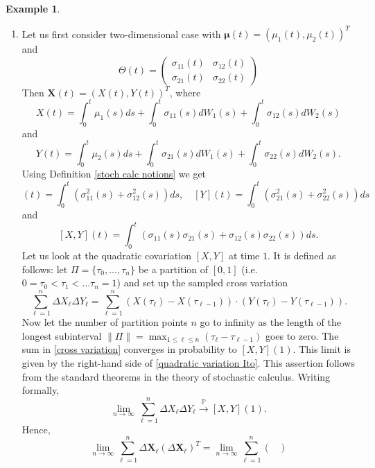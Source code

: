 \documentclass[a4paper,11pt]{article}
\theoremstyle{plain}
\theoremstyle{definition}
\newtheorem{exmp}[thm]{Example}
\begin{document}
	\begin{exmp} \label{quad var} \
		\begin{enumerate}
			\item 
			Let us first consider two-dimensional case with $\boldsymbol{\mu}(t) = (\mu_1(t), \mu_2(t))^T$ and
			\[\Theta(t) = \begin{pmatrix}
			\sigma_{11}(t) & \sigma_{12}(t) \\
			\sigma_{21}(t) & \sigma_{22}(t)
			\end{pmatrix} \]
			Then $\mathbf{X}(t) = (X(t), Y(t))^T$, where 
			\[X(t) = \int_0^t\mu_1(s) ds + \int_0^t\sigma_{11}(s) dW_1(s) + \int_0^t\sigma_{12}(s) dW_2(s)\] 
			and
			\[Y(t) = \int_0^t\mu_2(s) ds + \int_0^t\sigma_{21}(s) dW_1(s) + \int_0^t\sigma_{22}(s) dW_2(s).\]
			Using Definition \ref{stoch calc notions} we get
			\begin{equation}
			[X](t) = \int_{0}^{t}(\sigma_{11}^2(s) +\sigma_{12}^2(s)) ds, \quad  [Y](t) = \int_{0}^{t}(\sigma_{21}^2(s) +\sigma_{22}^2(s)) ds
			\end{equation}
			and
			\begin{equation} \label{quadratic variation Ito}
			[X, Y](t) = \int_{0}^{t}(\sigma_{11}(s)\sigma_{21}(s) + \sigma_{12}(s)\sigma_{22}(s)) ds. 
			\end{equation}
			Let us look at the quadratic covariation $[X, Y]$ at time $1$. It is defined as follows: let $\Pi = \{ \tau_0, \dots, \tau_n \}$ be a partition of $[0, 1]$ (i.e. $0 = \tau_0 < \tau_1 < \dots \tau_n = 1$) and set up the sampled cross variation
			\begin{equation} \label{cross variation}
			\sum_{\ell = 1}^{n} \Delta X_\ell \Delta Y_\ell = \sum_{\ell = 1}^{n} (X(\tau_\ell) - X(\tau_{\ell-1})) \cdot (Y(\tau_\ell) - Y(\tau_{\ell-1})).
			\end{equation}
			Now let the number of partition points $n$ go to infinity as the length of the longest subinterval $\| \Pi \| = \max_{1 \leq \ell \leq n}(\tau_{\ell} - \tau_{\ell-1}) $ goes to zero. The sum in \eqref{cross variation} converges in probability to $[X, Y](1)$. This limit is given by the right-hand side of \eqref{quadratic variation Ito}. This assertion follows from the standard theorems in the theory of stochastic calculus. Writing formally,
			\[  \lim_{n \rightarrow \infty} \sum_{\ell = 1}^{n} \Delta X_\ell \Delta Y_\ell \xrightarrow{\mathbb{P}} [X, Y](1). \]
			Hence,
			\[
			\lim_{n \rightarrow \infty} \sum_{\ell=1}^{n}\Delta \mathbf{X}_\ell(\Delta \mathbf{X}_\ell)^T
			= \lim_{n \rightarrow \infty} \sum_{\ell=1}^{n}\begin{pmatrix}

\end{pmatrix}\]
\end{enumerate}
\end{exmp}
\end{document}
